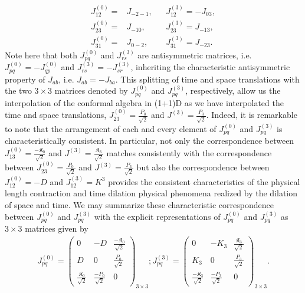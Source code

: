 \documentclass[%
 reprint,
superscriptaddress,
 amsmath,amssymb,
 aps,
]{revtex4-2}
\begin{document}
\begin{align}
\label{correspondence-of-matrix-elements}
    J^{(0)}_{12} =&J_{-2-1},&& J^{(3)}_{12} = -J_{03}, \nonumber\\
    J^{(0)}_{23} =&J_{-10} ,&& J^{(3)}_{23}=J_{-13},\nonumber\\
    J^{(0)}_{31}=&J_{0-2} ,&& J^{(3)}_{31}=J_{-23}.
\end{align}
Note here that both $J^{(0)}_{pq}$ and $J^{(3)}_{rs}$ are antisymmetric matrices, i.e. $J^{(0)}_{pq} = - J^{(0)}_{qp}$ and $J^{(3)}_{rs}=-J^{(3)}_{sr}$, inheriting the characteristic antisymmetric property of $J_{ab}$, i.e. $J_{ab}=-J_{ba}$.  
This splitting of time and space 
translations with the two $3\times3$ matrices denoted by $J^{(0)}_{pq}$ and $J^{(3)}_{pq}$, respectively, allow us the interpolation of the conformal algebra in (1+1)D as we have interpolated the time and space translations, $J^{(0)}_{23}=\frac{P_0}{\sqrt{2}}$ and $J^{(3)}=\frac{P_3}{\sqrt{2}}$. Indeed, it is remarkable to note that the arrangement of each and every element of $J^{(0)}_{pq}$ and $J^{(3)}_{pq}$ is characteristically consistent. In particular, not only the correspondence between $J^{(0)}_{13}=\frac{-\mathfrak{K}_0}{\sqrt{2}}$ and $J^{(3)}=\frac{\mathfrak{K}_3}{\sqrt{2}}$ matches consistently with the correspondence between $J^{(0)}_{23}=\frac{P_0}{\sqrt{2}}$ and $J^{(3)}=\frac{P_3}{\sqrt{2}}$ but also the correspondence between $J^{(0)}_{12}=-D$ and $J^{(3)}_{12}=K^3$ provides the consistent characteristics of the physical length contraction and time dilation physical phenomena realized by the dilation of space and time. 
We may summarize these characteristic correspondence between $J^{(0)}_{pq}$ and $J^{(3)}_{pq}$ with the explicit representations of $J^{(0)}_{pq}$ and $J^{(3)}_{pq}$ as $3\times3$ matrices given by 
\begin{align}
  J^{(0)}_{p q}=
  \begin{pmatrix}
  0&-D&\frac{-\mathfrak{K}_0}{\sqrt{2}}\\
  D&0&\frac{P_0}{\sqrt{2}}\\
    \frac{\mathfrak{K}_0}{\sqrt{2}}&\frac{-P_0}{\sqrt{2}}&0  
  \end{pmatrix}_{3\times3}; J^{(3)}_{pq}=
  \begin{pmatrix}
  0&-K_3&\frac{\mathfrak{K}_3}{\sqrt{2}}\\
  K_3&0&\frac{P_3}{\sqrt{2}}\\
    \frac{-\mathfrak{K}_3}{\sqrt{2}}&\frac{-P_3}{\sqrt{2}}&0  
  \end{pmatrix}_{3\times3}.
\end{align}
\end{document}
